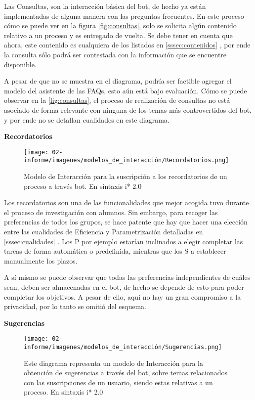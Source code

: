      \par Las Consultas, son la interacción básica del bot, de hecho ya están implementadas de alguna manera con las preguntas frecuentes. En este proceso cómo se puede ver en la figura \ref{fig:consultas}, solo se solicita algún contenido relativo a un proceso y es entregado de vuelta. Se debe tener en cuenta que ahora, este contenido es cualquiera de los listados en \ref{sssec:contenidos} , por ende la consulta sólo podrá ser contestada con la información que se encuentre disponible.
     \par A pesar de que no se muestra en el diagrama, podría ser factible agregar el modelo del asistente de las FAQs, esto aún está bajo evaluación.
     Cómo se puede observar en la \ref{fig:consultas}, el proceso de realización de consultas no está asociado de forma relevante con ninguna de los temas más controvertidos del bot, y por ende no se detallan cualidades en este diagrama.
     
     \newpage
     \par \textbf{Recordatorios}
    \begin{figure}[h!]
        \centering
        \texttt{[image: 02-informe/imagenes/modelos\_de\_interacción/Recordatorios.png]}
        \caption{Modelo de Interacción para la suscripción a los recordatorios de un proceso a través bot. En sintaxis i* 2.0}
        \label{fig:recordatorios}
    \end{figure}

    \par Los recordatorios son una de las funcionalidades que mejor acogida tuvo durante el proceso de investigación con alumnos. Sin embargo, para recoger las preferencias de todos los grupos, se hace patente que hay que hacer una elección entre las cualidades de Eficiencia y Parametrización detalladas en \ref{sssec:cualidades} . Los \acrshort{P} por ejemplo estarían inclinados a elegir completar las tareas de forma automática o predefinida, mientras que los \acrshort{S} a establecer manualmente los plazos.
    \par A sí mismo se puede observar que todas las preferencias independientes de cuáles sean, deben ser almacenadas en el bot, de hecho se depende de esto para poder completar los objetivos. A pesar de ello, aquí no hay un gran compromiso a la privacidad, por lo tanto se omitió del esquema.
    
    \newpage
    \textbf{Sugerencias}
    \begin{figure}[h!]
        \centering
        \texttt{[image: 02-informe/imagenes/modelos\_de\_interacción/Sugerencias.png]}
        \caption{Este diagrama representa un modelo de Interacción para la obtención de sugerencias a través del bot, sobre temas relacionados con las suscripciones de un usuario, siendo estas relativas a un proceso. En sintaxis i* 2.0}
        \label{fig:sugerencias}
    \end{figure}
    
